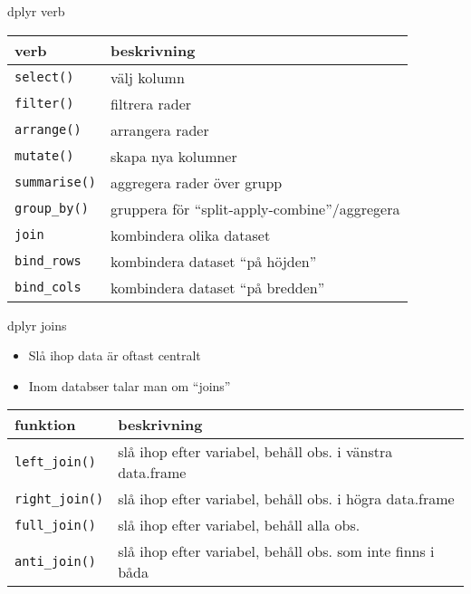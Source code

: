 \documentclass[
  11pt,
  ignorenonframetext,
  handout]{beamer}
\providecommand{\tightlist}{%
  \setlength{\itemsep}{0pt}\setlength{\parskip}{0pt}}
\begin{document}

\begin{frame}[fragile]{dplyr verb}
\protect\hypertarget{dplyr-verb}{}
\begin{longtable}[]{@{}ll@{}}
\toprule
verb & beskrivning \\
\midrule
\endhead
\texttt{select()} & välj kolumn \\
\texttt{filter()} & filtrera rader \\
\texttt{arrange()} & arrangera rader \\
\texttt{mutate()} & skapa nya kolumner \\
\texttt{summarise()} & aggregera rader över grupp \\
\texttt{group\_by()} & gruppera för ``split-apply-combine''/aggregera \\
\texttt{join} & kombindera olika dataset \\
\texttt{bind\_rows} & kombindera dataset ``på höjden'' \\
\texttt{bind\_cols} & kombindera dataset ``på bredden'' \\
\bottomrule
\end{longtable}
\end{frame}


\begin{frame}[fragile]{dplyr joins}
\protect\hypertarget{dplyr-joins}{}
\begin{itemize}
\tightlist
\item
  Slå ihop data är oftast centralt
\item
  Inom databser talar man om ``joins''
\end{itemize}

\begin{longtable}[]{@{}ll@{}}
\toprule
funktion & beskrivning \\
\midrule
\endhead
\texttt{left\_join()} & slå ihop efter variabel, behåll obs. i vänstra
data.frame \\
\texttt{right\_join()} & slå ihop efter variabel, behåll obs. i högra
data.frame \\
\texttt{full\_join()} & slå ihop efter variabel, behåll alla obs. \\
\texttt{anti\_join()} & slå ihop efter variabel, behåll obs. som inte
finns i båda \\
\bottomrule
\end{longtable}
\end{frame}
\end{document}
